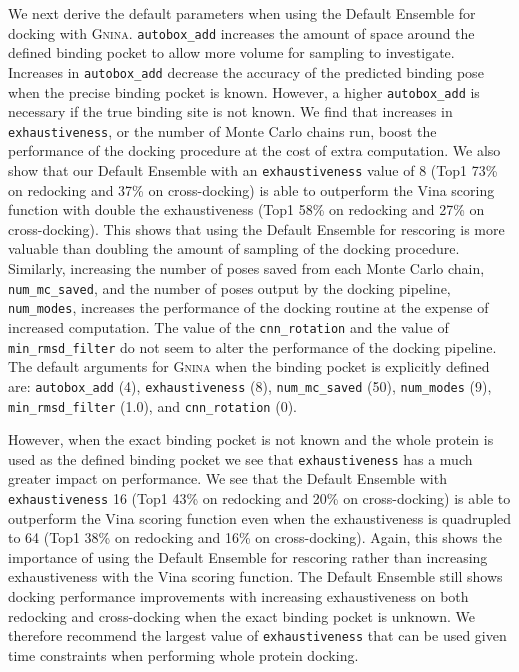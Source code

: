 \documentclass[linenumbers,doublespacing]{bmcart}
\begin{document}
We next derive the default parameters when using the Default Ensemble for docking with \textsc{Gnina}. \texttt{autobox\_add} increases the amount of space around the defined binding pocket to allow more volume for sampling to investigate. Increases in \texttt{autobox\_add} decrease the accuracy of the predicted binding pose when the precise binding pocket is known. However, a higher \texttt{autobox\_add} is necessary if the true binding site is not  known. We find that increases in \texttt{exhaustiveness}, or the number of Monte Carlo chains run, boost the performance of the docking procedure at the cost of extra computation. We also show that our Default Ensemble with an \texttt{exhaustiveness} value of 8 (Top1 73\% on redocking and 37\% on cross-docking) is able to outperform the Vina scoring function with double the exhaustiveness (Top1 58\% on redocking and 27\% on cross-docking). This shows that using the Default Ensemble for rescoring is more valuable than doubling the amount of sampling of the docking procedure. Similarly, increasing the number of poses saved from each Monte Carlo chain, \texttt{num\_mc\_saved}, and the number of poses output by the docking pipeline, \texttt{num\_modes}, increases the performance of the docking routine at the expense of increased computation. The value of the \texttt{cnn\_rotation} and the value of \texttt{min\_rmsd\_filter} do not seem to alter the performance of the docking pipeline. The default arguments for \textsc{Gnina} when the binding pocket is explicitly defined are: \texttt{autobox\_add} (4), \texttt{exhaustiveness} (8), \texttt{num\_mc\_saved} (50), \texttt{num\_modes} (9), \texttt{min\_rmsd\_filter} (1.0), and \texttt{cnn\_rotation} (0). 

However, when the exact binding pocket is not known and the whole protein is used as the defined binding pocket we see that \texttt{exhaustiveness} has a much greater impact on performance. We see that the Default Ensemble with \texttt{exhaustiveness} 16 (Top1 43\% on redocking and 20\% on cross-docking) is able to outperform the Vina scoring function even when the exhaustiveness is quadrupled to 64 (Top1 38\% on redocking and 16\% on cross-docking). Again, this shows the importance of using the Default Ensemble for rescoring rather than increasing exhaustiveness with the Vina scoring function. The Default Ensemble still shows docking performance improvements with increasing exhaustiveness on both redocking and cross-docking when the exact binding pocket is unknown. We therefore recommend the largest value of \texttt{exhaustiveness} that can be used given time constraints when performing whole protein docking.
\end{document}
